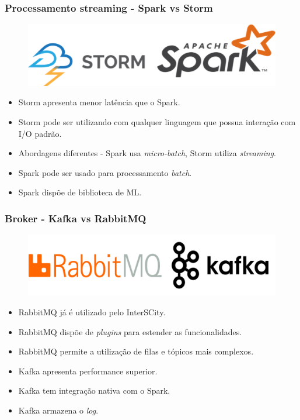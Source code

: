 \documentclass{beamer}
\begin{document}
  \begin{frame}
      \frametitle{Processamento streaming - Spark vs Storm}
      \begin{figure}
          \includegraphics[scale=0.6]{figures/StreamingProcessing.png}
      \end{figure}
      \begin{itemize}
          \item Storm apresenta menor latência que o Spark.
          \item Storm pode ser utilizando com qualquer linguagem que possua
              interação com I/O padrão.
          \item Abordagens diferentes - Spark usa \textit{micro-batch}, Storm utiliza
              \textit{streaming}.
          \item Spark pode ser usado para processamento \textit{batch}.
          \item Spark dispõe de biblioteca de ML.
      \end{itemize}
  \end{frame}

  \begin{frame}
      \frametitle{Broker - Kafka vs RabbitMQ}
      \begin{figure}
          \includegraphics[scale=0.3]{figures/Brokers.png}
      \end{figure}
      \begin{itemize}
          \item RabbitMQ já é utilizado pelo InterSCity.
          \item RabbitMQ dispõe de \textit{plugins} para estender as funcionalidades.
          \item RabbitMQ permite a utilização de filas e tópicos mais complexos.
          \item Kafka apresenta performance superior.
          \item Kafka tem integração nativa com o Spark.
          \item Kafka armazena o \textit{log}.
      \end{itemize}
  \end{frame}
\end{document}
